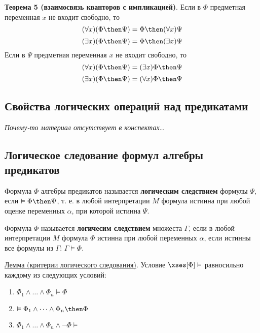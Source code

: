 \textbf{Теорема 5 (взаимосвязь кванторов с импликацией)}. Если в $\Phi$ предметная переменная $x$ не входит свободно, то
$$(\forall x)(\Phi \then \Psi) = \Phi \then (\forall x)\Psi$$
$$(\exists x)(\Phi \then \Psi) = \Phi \then (\exists x)\Psi$$
Если в $\Psi$ предметная переменная $x$ не входит свободно, то
$$(\forall x)(\Phi \then \Psi) = (\exists x)\Phi \then \Psi$$
$$(\exists x)(\Phi \then \Psi) = (\forall x)\Phi \then \Psi$$


\subsection{Свойства логических операций над предикатами}
\textit{Почему-то материал отсутствует в конспектах\dots}
\subsection{Логическое следование формул алгебры предикатов}
\dftion Формула $\Phi$ алгебры предикатов называется \textbf{логическим следствием} формулы $\Psi$, если $\vDash \Phi \then \Psi$, т. е. в любой интерпретации $M$ формула истинна при любой оценке переменных $\alpha$, при которой истинна $\Psi$.

\dftion Формула $\Phi$ называется \textbf{логичесим следствием} множеста $\Gamma$, если в любой интерпретации $M$ формула $\Phi$ истинна при любой переменных $\alpha$, если истинны все формулы из $\Gamma$: $\Gamma \vDash \Phi$.

\underline{Лемма (критерии логического следования)}. Условие $\xses[\Phi] \vDash$ равносильно каждому из следующих условий:
\begin{enumerate}
    \item $\Phi_1 \land \dots \land \Phi_n \vDash \Phi$
    \item $\vDash \Phi_1 \land \dots \land \Phi_n \then \Phi$
    \item $\Phi_1 \land \dots \land \Phi_n \land \lnot \Phi \vDash$
\end{enumerate}